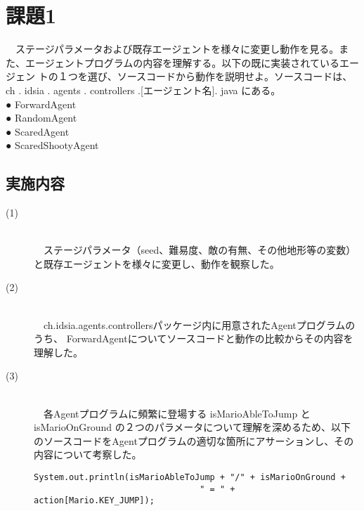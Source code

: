 \documentclass[a4j]{jarticle}
\begin{document}
\section{課題1}
\begin{screen}
　ステージパラメータおよび既存エージェントを様々に変更し動作を見る。また、エージェントプログラムの内容を理解する。以下の既に実装されているエージェン
トの１つを選び、ソースコードから動作を説明せよ。ソースコードは、ch . idsia . agents . controllers .[エージェント名]. java にある。\\
● ForwardAgent \\
● RandomAgent \\
● ScaredAgent \\
● ScaredShootyAgent 
\end{screen}
\subsection{実施内容}
\begin{description}
\item[(1)]~\\
　ステージパラメータ（seed、難易度、敵の有無、その他地形等の変数）と既存エージェントを様々に変更し、動作を観察した。
\item[(2)]~\\
　ch.idsia.agents.controllersパッケージ内に用意されたAgentプログラムのうち、
ForwardAgentについてソースコードと動作の比較からその内容を理解した。
\item[(3)]~\\
　各Agentプログラムに頻繁に登場する isMarioAbleToJump と isMarioOnGround の２つのパラメータについて理解を深めるため、以下のソースコードをAgentプログラムの適切な箇所にアサーションし、その内容について考察した。
\begin{verbatim}
System.out.println(isMarioAbleToJump + "/" + isMarioOnGround + 
                                 " = " + action[Mario.KEY_JUMP]);
\end{verbatim}
\end{description}
\end{document}
